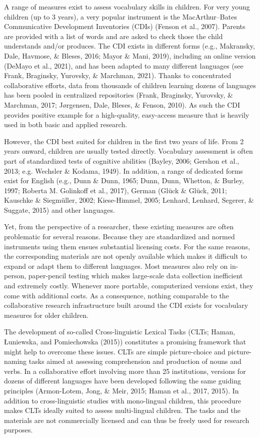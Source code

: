 \documentclass[
  man,floatsintext]{apa6}
\begin{document}
A range of measures exist to assess vocabulary skills in children. For very young children (up to 3 years), a very popular instrument is the MacArthur--Bates Communicative Development Inventories (CDIs) (Fenson et al., 2007). Parents are provided with a list of words and are asked to check those the child understands and/or produces. The CDI exists in different forms (e.g., Makransky, Dale, Havmose, \& Bleses, 2016; Mayor \& Mani, 2019), including an online version (DeMayo et al., 2021), and has been adapted to many different languages (see Frank, Braginsky, Yurovsky, \& Marchman, 2021). Thanks to concentrated collaborative efforts, data from thousands of children learning dozens of languages has been pooled in centralized repositories (Frank, Braginsky, Yurovsky, \& Marchman, 2017; Jørgensen, Dale, Bleses, \& Fenson, 2010). As such the CDI provides positive example for a high-quality, easy-access measure that is heavily used in both basic and applied research.

However, the CDI best suited for children in the first two years of life. From 2 years onward, children are usually tested directly. Vocabulary assessment is often part of standardized tests of cognitive abilities (Bayley, 2006; Gershon et al., 2013; e.g. Wechsler \& Kodama, 1949). In addition, a range of dedicated forms exist for English (e.g., Dunn \& Dunn, 1965; Dunn, Dunn, Whetton, \& Burley, 1997; Roberta M. Golinkoff et al., 2017), German (Glück \& Glück, 2011; Kauschke \& Siegmüller, 2002; Kiese-Himmel, 2005; Lenhard, Lenhard, Segerer, \& Suggate, 2015) and other languages.

Yet, from the perspective of a researcher, these existing measures are often problematic for several reasons. Because they are standardized and normed instruments using them ensues substantial licensing costs. For the same reasons, the corresponding materials are not openly available which makes it difficult to expand or adapt them to different languages. Most measures also rely on in-person, paper-pencil testing which makes large-scale data collection inefficient and extremely costly. Whenever more portable, computerized versions exist, they come with additional costs. As a consequence, nothing comparable to the collaborative research infrastructure built around the CDI exists for vocabulary measures for older children.

The development of so-called Cross-linguistic Lexical Tasks (CLTs; Haman, Łuniewska, and Pomiechowska (2015)) constitutes a promising framework that might help to overcome these issues. CLTs are simple picture-choice and picture-naming tasks aimed at assessing comprehension and production of nouns and verbs. In a collaborative effort involving more than 25 institutions, versions for dozens of different languages have been developed following the same guiding principles (Armon-Lotem, Jong, \& Meir, 2015; Haman et al., 2017, 2015). In addition to cross-linguistic studies with mono-lingual children, this procedure makes CLTs ideally suited to assess multi-lingual children. The tasks and the materials are not commercially licensed and can thus be freely used for research purposes.
\end{document}
